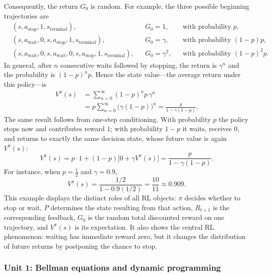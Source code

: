 \documentclass[11pt,a4paper]{article}
\theoremstyle{definition}
\begin{document}
\begin{example}
Consequently, the return $G_0$ is random. For example, the three possible beginning
trajectories are
\[
\begin{aligned}
&(s,a_{\mathrm{stop}},1,s_{\mathrm{terminal}}),
&&G_0=1,
&&\text{with probability }p,\\
&(s,a_{\mathrm{wait}},0,s,a_{\mathrm{stop}},1,s_{\mathrm{terminal}}),
&&G_0=\gamma,
&&\text{with probability }(1-p)p,\\
&(s,a_{\mathrm{wait}},0,s,a_{\mathrm{wait}},0,s,a_{\mathrm{stop}},1,
s_{\mathrm{terminal}}),
&&G_0=\gamma^2,
&&\text{with probability }(1-p)^2p.
\end{aligned}
\]
In general, after $n$ consecutive waits followed by stopping, the return is $\gamma^n$ and
the probability is $(1-p)^np$. Hence the state value---the average return under this
policy---is
\[
\begin{aligned}
V^\pi(s)
&=\sum_{n=0}^{\infty}(1-p)^np\,\gamma^n\\
&=p\sum_{n=0}^{\infty}\bigl(\gamma(1-p)\bigr)^n
=\frac{p}{1-\gamma(1-p)}.
\end{aligned}
\]
The same result follows from one-step conditioning. With probability $p$ the policy stops
now and contributes reward $1$; with probability $1-p$ it waits, receives $0$, and returns
to exactly the same decision state, whose future value is again $V^\pi(s)$:
\[
V^\pi(s)
=p\cdot1+(1-p)\bigl[0+\gamma V^\pi(s)\bigr]
=\frac{p}{1-\gamma(1-p)}.
\]
For instance, when $p=\tfrac12$ and $\gamma=0.9$,
\[
V^\pi(s)=\frac{1/2}{1-0.9(1/2)}=\frac{10}{11}\approx0.909.
\]
This example displays the distinct roles of all RL objects: $\pi$ decides whether to stop or
wait, $P$ determines the state resulting from that action, $R_{t+1}$ is the corresponding
feedback, $G_0$ is the random total discounted reward on one trajectory, and $V^\pi(s)$ is
its expectation. It also shows the central RL phenomenon: waiting has immediate reward zero,
but it changes the distribution of future returns by postponing the chance to stop.
\end{example}

\subsubsection{Unit 1: Bellman equations and dynamic programming}
\label{unit:1}
\end{document}
